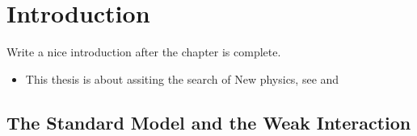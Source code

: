 
\chapter{Introduction}
\label{Introduction}

{\color{red} Write a nice introduction after the chapter is complete.}

\begin{itemize}
  \item   This thesis is about assiting the search of New physics, see   and 
\end{itemize}

%
%

\section{The Standard Model and the Weak Interaction}
\label{The_Standard_Model}


